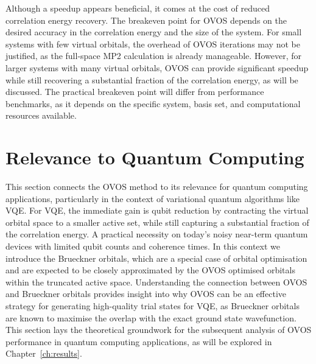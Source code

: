 Although a speedup appears beneficial, it comes at the cost of reduced correlation energy recovery. The breakeven point for OVOS depends on the desired accuracy in the correlation energy and the size of the system. For small systems with few virtual orbitals, the overhead of OVOS iterations may not be justified, as the full-space MP2 calculation is already manageable. However, for larger systems with many virtual orbitals, OVOS can provide significant speedup while still recovering a substantial fraction of the correlation energy, as will be discussed. The practical breakeven point will differ from performance benchmarks, as it depends on the specific system, basis set, and computational resources available. 













































\section{Relevance to Quantum Computing}
\label{sec:theory_relevance_qc}

This section connects the OVOS method to its relevance for quantum computing applications, particularly in the context of variational quantum algorithms like VQE. For VQE, the immediate gain is qubit reduction by contracting the virtual orbital space to a smaller active set, while still capturing a substantial fraction of the correlation energy. A practical necessity on today’s noisy near-term quantum devices with limited qubit counts and coherence times. In this context we introduce the Brueckner orbitals, which are a special case of orbital optimisation and are expected to be closely approximated by the OVOS optimised orbitals within the truncated active space. Understanding the connection between OVOS and Brueckner orbitals provides insight into why OVOS can be an effective strategy for generating high-quality trial states for VQE, as Brueckner orbitals are known to maximise the overlap with the exact ground state wavefunction. This section lays the theoretical groundwork for the subsequent analysis of OVOS performance in quantum computing applications, as will be explored in Chapter~\ref{ch:results}.


